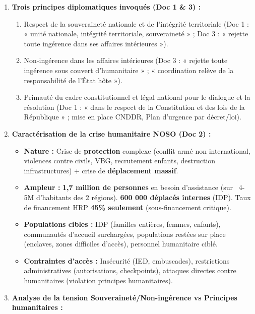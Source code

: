 \documentclass[11pt]{article}
\newcommand{\cle}[1]{{\popxbold\color{popdark}#1}}
\begin{document}
\begin{corrige}
\begin{enumerate}
    \item \textbf{Trois principes diplomatiques invoqués (Doc 1 \& 3) :}
    \begin{enumerate}
        \item \cle{Respect de la souveraineté nationale} et de l'\cle{intégrité territoriale} (Doc 1 : « unité nationale, intégrité territoriale, souveraineté » ; Doc 3 : « rejette toute ingérence dans ses affaires intérieures »).
        \item \cle{Non-ingérence} dans les affaires intérieures (Doc 3 : « rejette toute ingérence sous couvert d'humanitaire » ; « coordination relève de la responsabilité de l'État hôte »).
        \item \cle{Primauté du cadre constitutionnel et légal national} pour le dialogue et la résolution (Doc 1 : « dans le respect de la Constitution et des lois de la République » ; mise en place CNDDR, Plan d'urgence par décret/loi).
    \end{enumerate}
    \item \textbf{Caractérisation de la crise humanitaire NOSO (Doc 2) :}
    \begin{itemize}
        \item \textbf{Nature :} Crise de \textbf{protection} complexe (conflit armé non international, violences contre civils, VBG, recrutement enfants, destruction infrastructures) + crise de \textbf{déplacement massif}.
        \item \textbf{Ampleur :} \textbf{1,7 million de personnes} en besoin d'assistance (sur ~4-5M d'habitants des 2 régions). \textbf{600 000 déplacés internes} (IDP). Taux de financement HRP \textbf{45\% seulement} (sous-financement critique).
        \item \textbf{Populations cibles :} IDP (familles entières, femmes, enfants), communautés d'accueil surchargées, populations restées sur place (enclaves, zones difficiles d'accès), personnel humanitaire ciblé.
        \item \textbf{Contraintes d'accès :} Insécurité (IED, embuscades), restrictions administratives (autorisations, checkpoints), attaques directes contre humanitaires (violation principes humanitaires).
    \end{itemize}
    \item \textbf{Analyse de la tension Souveraineté/Non-ingérence vs Principes humanitaires :}

\end{enumerate}
\end{corrige}
\end{document}

